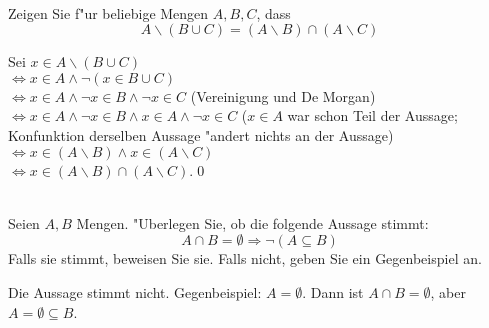 \\
Zeigen Sie f"ur beliebige Mengen $A,B,C$, dass \[A\backslash(B\cup C)=(A\backslash B)\cap(A\backslash C)\]

\begin{loesung}
Sei $x\in A\backslash (B\cup C)$\\
$\Leftrightarrow x\in A\wedge \neg (x\in B\cup C)$\\
$\Leftrightarrow x\in A\wedge \neg x\in B \wedge \neg x\in C$ (Vereinigung und De Morgan)\\
$\Leftrightarrow x\in A\wedge \neg x\in B\wedge x\in A\wedge \neg x\in C$ ($x\in A$ war schon Teil der Aussage; Konfunktion derselben Aussage "andert nichts an der Aussage)\\
$\Leftrightarrow x\in (A\backslash B)\wedge x\in (A\backslash C)$\\
$\Leftrightarrow x\in (A\backslash B)\cap (A\backslash C)$.\qed
\end{loesung}

\\
Seien $A,B$ Mengen. "Uberlegen Sie, ob die folgende Aussage stimmt: 
\[A\cap B=\emptyset\Rightarrow \neg (A\subseteq B)\]
Falls sie stimmt, beweisen Sie sie. Falls nicht, geben Sie ein Gegenbeispiel an.

\begin{loesung}
Die Aussage stimmt nicht. Gegenbeispiel: $A=\emptyset$. Dann ist $A\cap B=\emptyset$, aber $A=\emptyset\subseteq B$.
\end{loesung}
